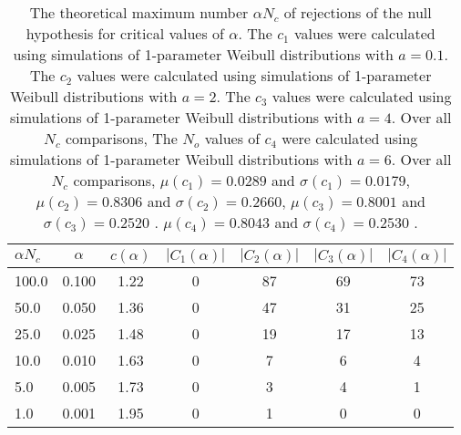 \begin{table}[h!]
\begin{center}
\begin{tabular}{| l | c | c | c | c | c | c |}\hline
$\alpha N_c$ & $\alpha$ & $c(\alpha)$ & $|C_1(\alpha)|$ & $|C_2(\alpha)|$ & $|C_3(\alpha)|$ & $|C_4(\alpha)|$ \\\hline
100.0 & 0.100 & 1.22 & 0 & 87 & 69 & 73 \\\hline
50.0 & 0.050 & 1.36 & 0 & 47 & 31 & 25 \\\hline
25.0 & 0.025 & 1.48 & 0 & 19 & 17 & 13 \\\hline
10.0 & 0.010 & 1.63 & 0 & 7 & 6 & 4 \\\hline
5.0 & 0.005 & 1.73 & 0 & 3 & 4 & 1 \\\hline
1.0 & 0.001 & 1.95 & 0 & 1 & 0 & 0 \\\hline
\end{tabular}
\caption{The theoretical maximum number $\alpha N_c$ of rejections
of the null hypothesis for critical values of $\alpha$.
The $c_1$ values were calculated using simulations of 1-parameter Weibull distributions with $a=0.1$.
The $c_2$ values were calculated using simulations of 1-parameter Weibull distributions with $a=2$.
The $c_3$ values were calculated using simulations of 1-parameter Weibull distributions with $a=4$.
Over all $N_c$ comparisons,
The $N_o$ values of $c_4$ were calculated using simulations of
 1-parameter Weibull distributions with $a=6$.
Over all $N_c$ comparisons,
 $\mu(c_1)=0.0289$ and $\sigma(c_1)=0.0179$,
 $\mu(c_2)=0.8306$ and $\sigma(c_2)=0.2660$,
 $\mu(c_3)=0.8001$ and $\sigma(c_3)=0.2520$ .
 $\mu(c_4)=0.8043$ and $\sigma(c_4)=0.2530$ .
}
\end{center}
\end{table}